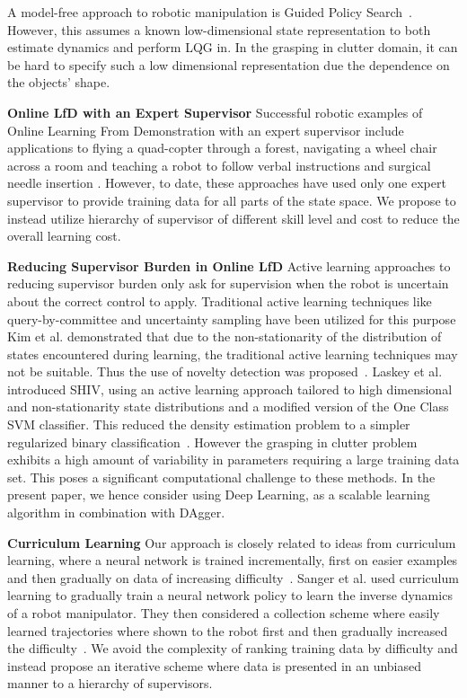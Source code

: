 \documentclass[10pt, conference]{ieeeconf}      %
\begin{document}
A model-free approach to robotic manipulation is Guided Policy Search~\cite{levine2015end}. However, this assumes a
known low-dimensional state representation to both estimate dynamics and perform LQG in. In the grasping in clutter
domain, it can be hard to specify such a low dimensional representation due the dependence on the objects' shape.

\noindent \textbf{Online LfD with an Expert Supervisor}
Successful robotic examples of Online Learning From Demonstration with an expert supervisor include applications to flying a quad-copter through a forest, navigating a wheel chair across a room and teaching a robot to follow verbal instructions and surgical needle insertion \cite{ross2013learning, kim2013maximum, duvallet2013imitation, laskeyshiv}. 
However, to date, these approaches have used only one expert supervisor to provide training data for all parts of the
state space. We propose to instead utilize hierarchy of supervisor of different skill level and cost to reduce the
overall learning cost. 

\noindent\textbf{Reducing Supervisor Burden in Online LfD} 
Active learning approaches to reducing supervisor burden only ask for supervision when the robot is uncertain about the
correct control to apply. Traditional active learning techniques like query-by-committee and uncertainty sampling have
been utilized for this purpose \cite{chernova2009interactive,judah2011active,grollman2007dogged}
Kim et al. demonstrated that due to the non-stationarity of the distribution of states encountered during
learning, the traditional active learning techniques may not be suitable.
Thus the use of novelty detection was proposed~\cite{kim2013maximum}. Laskey et al. introduced SHIV, using an active
learning approach tailored to high dimensional and non-stationarity state distributions and a modified version of the
One Class SVM classifier. This reduced the density estimation problem to a 
simpler regularized binary classification~\cite{laskeyshiv}. However the grasping in clutter problem exhibits a high amount
of variability in parameters requiring a large training data set. This poses a significant computational challenge to these methods.
In the present paper, we hence consider using Deep Learning, as a scalable learning algorithm in combination
with DAgger.

\noindent\textbf{Curriculum Learning}
Our approach is closely related to ideas from curriculum learning, where a neural network is trained  
incrementally, first on easier examples and then gradually on data of increasing difficulty~\cite{bengio2009curriculum}.
Sanger et al. used curriculum learning to gradually train a neural network policy to learn the inverse
dynamics of a robot manipulator. They then considered a collection scheme where easily learned trajectories where shown
to the robot first and then gradually increased the difficulty~\cite{sanger1994neural}.
We avoid the complexity of ranking training data by difficulty and instead propose an iterative scheme where
data is presented in an unbiased manner to a hierarchy of supervisors.
\end{document}

